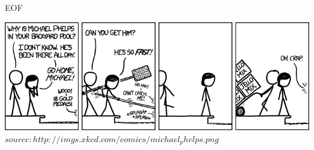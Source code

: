 		
	\begin{frame} {EOF}
		\begin{center}
			\includegraphics[scale=0.4]{graphics/eof4.png}\\
			\tiny $source: http://imgs.xkcd.com/comics/michael_phelps.png$
		\end{center}
	\end{frame}


